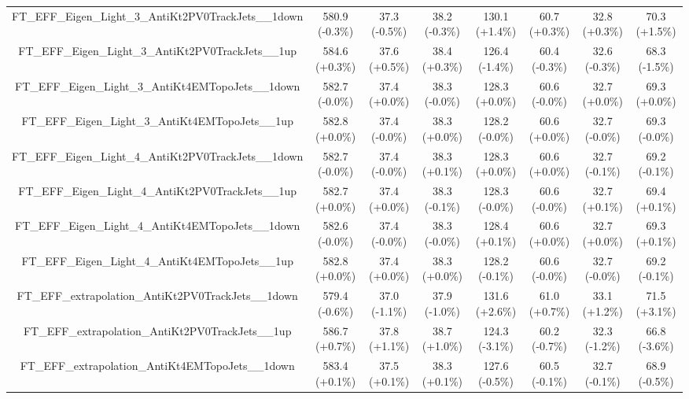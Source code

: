 \begin{table}[htbp!]
\begin{tiny}
\begin{center}
\begin{tabular}{c|c|c|c||c|c|c|c}
FT\_EFF\_Eigen\_Light\_3\_AntiKt2PV0TrackJets\_\_1down       & 580.9     (-0.3\%) & 37.3      (-0.5\%) & 38.2      (-0.3\%) & 130.1     (+1.4\%) & 60.7      (+0.3\%) & 32.8      (+0.3\%) & 70.3      (+1.5\%) \\ 
FT\_EFF\_Eigen\_Light\_3\_AntiKt2PV0TrackJets\_\_1up         & 584.6     (+0.3\%) & 37.6      (+0.5\%) & 38.4      (+0.3\%) & 126.4     (-1.4\%) & 60.4      (-0.3\%) & 32.6      (-0.3\%) & 68.3      (-1.5\%) \\ 
FT\_EFF\_Eigen\_Light\_3\_AntiKt4EMTopoJets\_\_1down         & 582.7     (-0.0\%) & 37.4      (+0.0\%) & 38.3      (-0.0\%) & 128.3     (+0.0\%) & 60.6      (-0.0\%) & 32.7      (+0.0\%) & 69.3      (+0.0\%) \\ 
FT\_EFF\_Eigen\_Light\_3\_AntiKt4EMTopoJets\_\_1up           & 582.8     (+0.0\%) & 37.4      (-0.0\%) & 38.3      (+0.0\%) & 128.2     (-0.0\%) & 60.6      (+0.0\%) & 32.7      (-0.0\%) & 69.3      (-0.0\%) \\ 
FT\_EFF\_Eigen\_Light\_4\_AntiKt2PV0TrackJets\_\_1down       & 582.7     (-0.0\%) & 37.4      (-0.0\%) & 38.3      (+0.1\%) & 128.3     (+0.0\%) & 60.6      (+0.0\%) & 32.7      (-0.1\%) & 69.2      (-0.1\%) \\ 
FT\_EFF\_Eigen\_Light\_4\_AntiKt2PV0TrackJets\_\_1up         & 582.7     (+0.0\%) & 37.4      (+0.0\%) & 38.3      (-0.1\%) & 128.3     (-0.0\%) & 60.6      (-0.0\%) & 32.7      (+0.1\%) & 69.4      (+0.1\%) \\ 
FT\_EFF\_Eigen\_Light\_4\_AntiKt4EMTopoJets\_\_1down         & 582.6     (-0.0\%) & 37.4      (-0.0\%) & 38.3      (-0.0\%) & 128.4     (+0.1\%) & 60.6      (+0.0\%) & 32.7      (+0.0\%) & 69.3      (+0.1\%) \\ 
FT\_EFF\_Eigen\_Light\_4\_AntiKt4EMTopoJets\_\_1up           & 582.8     (+0.0\%) & 37.4      (+0.0\%) & 38.3      (+0.0\%) & 128.2     (-0.1\%) & 60.6      (-0.0\%) & 32.7      (-0.0\%) & 69.2      (-0.1\%) \\ 
FT\_EFF\_extrapolation\_AntiKt2PV0TrackJets\_\_1down         & 579.4     (-0.6\%) & 37.0      (-1.1\%) & 37.9      (-1.0\%) & 131.6     (+2.6\%) & 61.0      (+0.7\%) & 33.1      (+1.2\%) & 71.5      (+3.1\%) \\ 
FT\_EFF\_extrapolation\_AntiKt2PV0TrackJets\_\_1up           & 586.7     (+0.7\%) & 37.8      (+1.1\%) & 38.7      (+1.0\%) & 124.3     (-3.1\%) & 60.2      (-0.7\%) & 32.3      (-1.2\%) & 66.8      (-3.6\%) \\ 
FT\_EFF\_extrapolation\_AntiKt4EMTopoJets\_\_1down           & 583.4     (+0.1\%) & 37.5      (+0.1\%) & 38.3      (+0.1\%) & 127.6     (-0.5\%) & 60.5      (-0.1\%) & 32.7      (-0.1\%) & 68.9      (-0.5\%) \\ 

\end{tabular}
\end{center}
\end{tiny}
\end{table}
